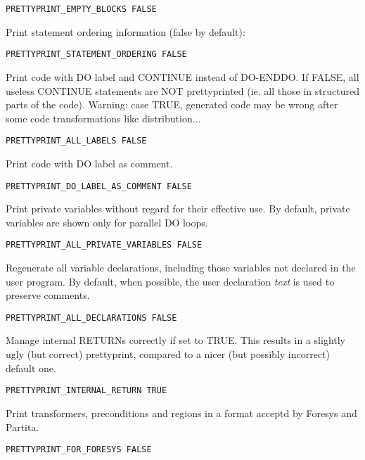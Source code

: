 \begin{verbatim}
PRETTYPRINT_EMPTY_BLOCKS FALSE
\end{verbatim}

Print statement ordering information (false by default):

\begin{verbatim}
PRETTYPRINT_STATEMENT_ORDERING FALSE
\end{verbatim}

Print code with DO label and CONTINUE instead of DO-ENDDO. If FALSE, all
useless CONTINUE statements are NOT prettyprinted (ie. all those in
structured parts of the code). Warning: case TRUE, generated code may be
wrong after some code transformations like distribution...

\begin{verbatim}
PRETTYPRINT_ALL_LABELS FALSE
\end{verbatim}

Print code with DO label as comment.

\begin{verbatim}
PRETTYPRINT_DO_LABEL_AS_COMMENT FALSE
\end{verbatim}

Print private variables without regard for their effective use. By
default, private variables are shown only for parallel DO loops.

\begin{verbatim}
PRETTYPRINT_ALL_PRIVATE_VARIABLES FALSE
\end{verbatim}


Regenerate all variable declarations, including those variables not
declared in the user program. By default, when possible, the user
declaration {\em text} is used to preserve comments.

\begin{verbatim}
PRETTYPRINT_ALL_DECLARATIONS FALSE
\end{verbatim}

Manage internal RETURNs correctly if set to TRUE.  This results in a
slightly ugly (but correct) prettyprint, compared to a nicer (but
possibly incorrect) default one.

\begin{verbatim}
PRETTYPRINT_INTERNAL_RETURN TRUE
\end{verbatim}

Print transformers, preconditions and regions in a format acceptd by
Foresys and Partita.

\begin{verbatim}
PRETTYPRINT_FOR_FORESYS FALSE
\end{verbatim}

